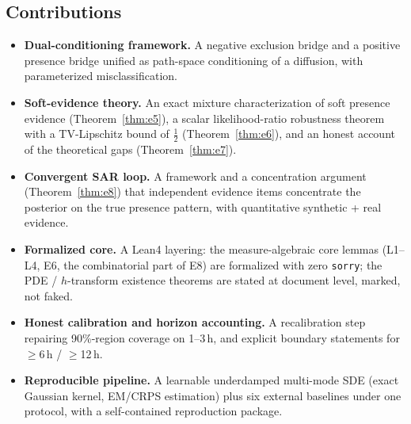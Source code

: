 \documentclass[11pt]{article}
\begin{document}
\subsection{Contributions}
\label{sec:contrib}
\begin{itemize}
\item \textbf{Dual-conditioning framework.} A negative exclusion bridge and a positive
presence bridge unified as path-space conditioning of a diffusion, with parameterized
misclassification.
\item \textbf{Soft-evidence theory.} An exact mixture characterization of soft presence
evidence (Theorem~\ref{thm:e5}), a scalar likelihood-ratio robustness theorem with a
TV-Lipschitz bound of $\tfrac12$ (Theorem~\ref{thm:e6}), and an honest account of the
theoretical gaps (Theorem~\ref{thm:e7}).
\item \textbf{Convergent SAR loop.} A framework and a concentration argument
(Theorem~\ref{thm:e8}) that independent evidence items concentrate the posterior on the
true presence pattern, with quantitative synthetic + real evidence.
\item \textbf{Formalized core.} A Lean4 layering: the measure-algebraic core lemmas
(L1--L4, E6, the combinatorial part of E8) are formalized with zero \texttt{sorry}; the
PDE / $h$-transform existence theorems are stated at document level, marked, not faked.
\item \textbf{Honest calibration and horizon accounting.} A recalibration step repairing
90\%-region coverage on 1--3\,h, and explicit boundary statements for $\ge$6\,h / $\ge$12\,h.
\item \textbf{Reproducible pipeline.} A learnable underdamped multi-mode SDE (exact
Gaussian kernel, EM/CRPS estimation) plus six external baselines under one protocol,
with a self-contained reproduction package.
\end{itemize}

\end{document}
